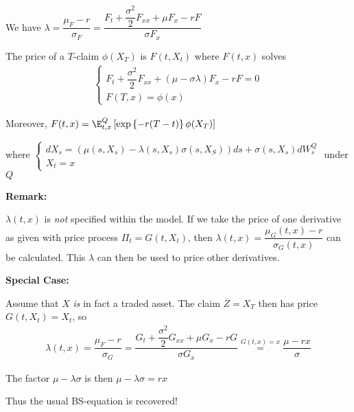 \par\bigskip
\noindent We have $\lambda = \dfrac{\mu_F-r}{\sigma_F} = \dfrac{F_t+\dfrac{\sigma^2}{2}F_{xx}+\mu F_x-rF}{\sigma F_x}$
\par\bigskip
\begin{lem}[]{}
  The price of a $T$-claim $\phi(X_T)$ is $F(t,X_t)$ where  $F(t,x)$ solves
  \begin{equation*}
    \begin{gathered}
      \begin{cases}
        F_t+\dfrac{\sigma^2}{2}F_{xx}+(\mu-\sigma\lambda)F_x-rF=0\\
        F(T,x) = \phi(x)
      \end{cases}
    \end{gathered}
  \end{equation*}
  \par\bigskip
  \noindent Moreover, $F(t,x) = \E_{t,x}^Q\left[\text{exp}\left\{-r(T-t)\right\}\phi(X_T)\right]$\par
  \noindent where $\begin{cases}
    dX_s = \left(\mu(s,X_s)-\lambda(s,X_s)\sigma(s,X_S)\right)ds+\sigma(s,X_s)dW_s^Q\\
    X_t = x
  \end{cases}$ under $Q$
\end{lem}
\par\bigskip
\noindent\textbf{Remark:}\par
\noindent $\lambda(t,x)$ is \textit{not} specified within the model. If we take the price of one derivative as given with price process $\Pi_t = G(t,X_t)$, then $\lambda(t,x) = \dfrac{\mu_G(t,x)-r}{\sigma_G(t,x)}$ can be calculated. This $\lambda$ can then be used to price other derivatives.
\par\bigskip
\noindent\textbf{Special Case:}\par
\noindent Assume that $X$ \textit{is} in fact a traded asset. The claim $\overline{Z} = X_T$ then has price $G(t,X_t) = X_t$, so
\begin{equation*}
  \begin{gathered}
    \lambda(t,x) = \dfrac{\mu_F-r}{\sigma_G} = \dfrac{G_t+\dfrac{\sigma^2}{2}G_{xx}+\mu G_x-rG}{\sigma G_x} \stackrel{G(t,x) = x}{=} \dfrac{\mu-rx}{\sigma}
  \end{gathered}
\end{equation*}\par
\noindent The factor $\mu-\lambda\sigma$ is then $\mu-\lambda\sigma = rx$\par
\noindent Thus the usual BS-equation is recovered!
